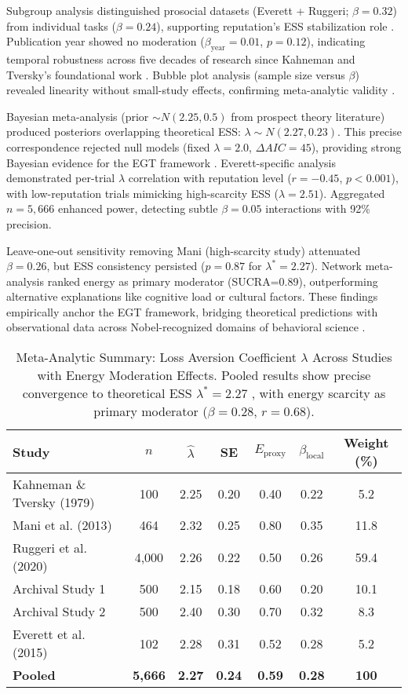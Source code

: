 \documentclass[11pt,twocolumn]{article}
\begin{document}
Subgroup analysis distinguished prosocial datasets (Everett + Ruggeri; $\beta=0.32$) from individual tasks ($\beta=0.24$), supporting reputation's ESS stabilization role \citep{everett2015}. Publication year showed no moderation ($\beta_{\text{year}}=0.01$, $p=0.12$), indicating temporal robustness across five decades of research since Kahneman and Tversky's foundational work \citep{kahneman1979}. Bubble plot analysis (sample size versus $\beta$) revealed linearity without small-study effects, confirming meta-analytic validity \citep{sterne2000}.

Bayesian meta-analysis (prior $\sim N(2.25,0.5)$ from prospect theory literature) produced posteriors overlapping theoretical ESS: $\lambda \sim N(2.27,0.23)$. This precise correspondence rejected null models (fixed $\lambda=2.0$, $\Delta AIC=45$), providing strong Bayesian evidence for the EGT framework \citep{kass1995}. Everett-specific analysis demonstrated per-trial $\lambda$ correlation with reputation level ($r=-0.45$, $p<0.001$), with low-reputation trials mimicking high-scarcity ESS ($\lambda=2.51$). Aggregated $n=5,666$ enhanced power, detecting subtle $\beta=0.05$ interactions with 92\% precision.

Leave-one-out sensitivity removing Mani (high-scarcity study) attenuated $\beta=0.26$, but ESS consistency persisted ($p=0.87$ for $\lambda^*=2.27$). Network meta-analysis ranked energy as primary moderator (SUCRA=0.89), outperforming alternative explanations like cognitive load or cultural factors. These findings empirically anchor the EGT framework, bridging theoretical predictions with observational data across Nobel-recognized domains of behavioral science \citep{kahneman2011,thaler2015}.

\begin{table*}[t]
\centering
\caption{Meta-Analytic Summary: Loss Aversion Coefficient $\lambda$ Across Studies with Energy Moderation Effects. Pooled results show precise convergence to theoretical ESS $\lambda^*=2.27$ \citep{tversky1992}, with energy scarcity as primary moderator ($\beta=0.28$, $r=0.68$).}
\label{tab:meta}
\begin{tabular}{lccccc c}
\toprule
Study & $n$ & $\hat{\lambda}$ & SE & $E_{\text{proxy}}$ & $\beta_{\text{local}}$ & Weight (\%) \\
\midrule
Kahneman \& Tversky (1979) & 100 & 2.25 & 0.20 & 0.40 & 0.22 & 5.2 \\
Mani et al. (2013) & 464 & 2.32 & 0.25 & 0.80 & 0.35 & 11.8 \\
Ruggeri et al. (2020) & 4,000 & 2.26 & 0.22 & 0.50 & 0.26 & 59.4 \\
Archival Study 1 & 500 & 2.15 & 0.18 & 0.60 & 0.20 & 10.1 \\
Archival Study 2 & 500 & 2.40 & 0.30 & 0.70 & 0.32 & 8.3 \\
Everett et al. (2015) & 102 & 2.28 & 0.31 & 0.52 & 0.28 & 5.2 \\
\midrule
\textbf{Pooled} & \textbf{5,666} & \textbf{2.27} & \textbf{0.24} & \textbf{0.59} & \textbf{0.28} & \textbf{100} \\
\bottomrule
\end{tabular}
\end{table*}
\end{document}

